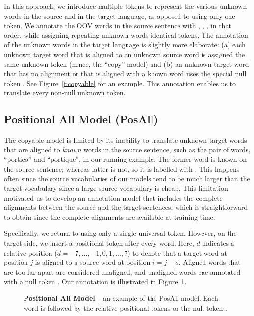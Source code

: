 In this approach, we introduce multiple tokens to represent the various unknown words in the 
source and in the target language, as opposed to using only one \unksym{} token. 
We annotate the OOV words in the source sentence
with , , , in that order,
while assigning repeating unknown words identical tokens. 
The annotation of the unknown words in the target language is slightly more elaborate: (a) each 
unknown target word that is aligned to an unknown source word
is assigned the same unknown token (hence, the ``copy'' model) and 
(b) an unknown target word that has no 
alignment or that is aligned with a known word uses the special null token \unknull{}. 
See Figure~\ref{f:copyable} for an example.  This annotation enables us to 
translate every non-null unknown token.

\subsection{Positional All Model (PosAll)}
The copyable model is limited by its inability to translate unknown 
target words that are aligned to \emph{known} words in the source sentence, such as the pair of 
words, ``portico'' and ``portique'', in our running example. 
The former word is known on the source sentence; whereas latter is not, so it is labelled with \unknull{}.
This happens often since the source vocabularies of our models tend to be much 
larger than the target vocabulary since a large source vocabulary is cheap.
This limitation motivated us to develop an annotation model that includes the complete 
alignments between the source and the target sentences, which is straightforward to obtain
 since the complete alignments are available at training time.  

Specifically, we return to using only a single universal \unksym{} token. 
However, on the target side, 
we insert a positional token  after every word. Here, $d$ indicates a relative position 
($d=-7,\ldots,-1,0,1,\ldots,7$) to denote that a target word at position $j$ is aligned 
to a source word 
at position $i=j-d$. Aligned words that are too far apart are considered unaligned, and 
unaligned words rae annotated
with a null token . Our annotation is illustrated in 
Figure~\ref{f:pos_all}.

\begin{figure}
\caption[Positional All Model]{ {\bf Positional All Model} -- an example of the PosAll model. Each word is followed by the relative positional tokens  or the null token \posnull{}. }
\label{f:pos_all}
\end{figure}

